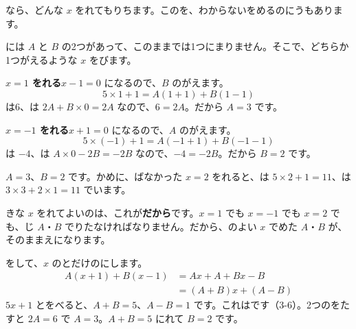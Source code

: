 
\leavevmode\label{bk:3-8:dainyu}なら、どんな $x$ をれてもりちます。このを、わからないをめるのにうもあります。


には $A$ と $B$ の2つがあって、このままでは1つにまりません。そこで、どちらか1つがえるような $x$ をびます。

\noindent\textbf{$x=1$ をれる}\quad $x-1=0$ になるので、$B$ のがえます。
\[ 5\times1+1=A(1+1)+B(1-1) \]
は6、は $2A+B\times0=2A$ なので、$6=2A$。だから $A=3$ です。

\noindent\textbf{$x=-1$ をれる}\quad $x+1=0$ になるので、$A$ のがえます。
\[ 5\times(-1)+1=A(-1+1)+B(-1-1) \]
は $-4$、は $A\times0-2B=-2B$ なので、$-4=-2B$。だから $B=2$ です。

$A=3$、$B=2$ です。かめに、ばなかった $x=2$ をれると、は $5\times2+1=11$、は $3\times3+2\times1=11$ でいます。

きな $x$ をれてよいのは、これが\textbf{だから}です。$x=1$ でも $x=-1$ でも $x=2$ でも、じ $A$・$B$ でりたなければなりません。だから、のよい $x$ でめた $A$・$B$ が、そのままえになります。

をして、$x$ のとだけのにします。
\begin{align*}
A(x+1)+B(x-1)&=Ax+A+Bx-B\\
&=(A+B)x+(A-B)
\end{align*}
 $5x+1$ とをべると、$A+B=5$、$A-B=1$ です。これはです（3-6）。2つのをたすと $2A=6$ で $A=3$。$A+B=5$ にれて $B=2$ です。

